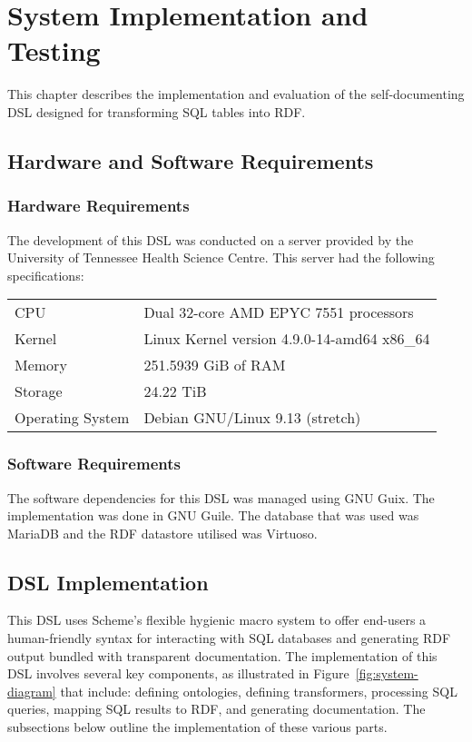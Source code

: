 \chapter{System Implementation and Testing}

This chapter describes the implementation and evaluation of the self-documenting DSL designed for transforming SQL tables into RDF\@.

\section{Hardware and Software Requirements}

\subsection{Hardware Requirements}

The development of this DSL was conducted on a server provided by the University of Tennessee Health Science Centre.  This server had the following specifications:

\begin{center}
\begin{tabular}{ll}
CPU & Dual 32-core AMD EPYC 7551 processors\\
Kernel & Linux Kernel version 4.9.0{-}14{-}amd64 x86\_64\\
Memory & 251.5939 GiB of RAM\\
Storage & 24.22 TiB\\
Operating System & Debian GNU/Linux 9.13 (stretch)\\
\end{tabular}
\end{center}

\subsection{Software Requirements}

The software dependencies for this DSL was managed using GNU Guix.  The implementation was done in GNU Guile.  The database that was used was MariaDB and the RDF datastore utilised was Virtuoso.

\section{DSL Implementation}

This DSL uses Scheme's flexible hygienic macro system to offer end-users a human-friendly syntax for interacting with SQL databases and generating RDF output bundled with transparent documentation.  The implementation of this DSL involves several key components, as illustrated in Figure~\ref{fig:system-diagram} that include: defining ontologies, defining transformers, processing SQL queries, mapping SQL results to RDF, and generating documentation.  The subsections below outline the implementation of these various parts.

